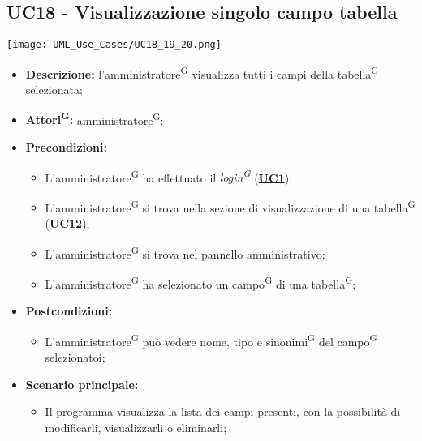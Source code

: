 \subsection{UC18 - Visualizzazione singolo campo tabella}
\label{sec:UC18}
\texttt{[image: UML\_Use\_Cases/UC18\_19\_20.png]}
\begin{itemize}
	\item \textbf{Descrizione:} l’amministratore\textsuperscript{G} visualizza tutti i campi della tabella\textsuperscript{G} selezionata;
	\item \textbf{Attori\textsuperscript{G}:} amministratore\textsuperscript{G};
	\item \textbf{Precondizioni:} 
	\begin{itemize}
		\item L’amministratore\textsuperscript{G} ha effettuato il \textit{login\textsuperscript{G}} (\hyperref[sec:UC1]{\textbf{UC1}});
		\item L’amministratore\textsuperscript{G} si trova nella sezione di visualizzazione di una tabella\textsuperscript{G} (\hyperref[sec:UC12]{\textbf{UC12}});
		\item L’amministratore\textsuperscript{G} si trova nel pannello amministrativo;
		\item L'amministratore\textsuperscript{G} ha selezionato un campo\textsuperscript{G} di una tabella\textsuperscript{G};
	\end{itemize}
	\item \textbf{Postcondizioni:} 
	\begin{itemize}
		\item L'amministratore\textsuperscript{G} può vedere nome, tipo e sinonimi\textsuperscript{G} del campo\textsuperscript{G} selezionatoi;
	\end{itemize}
	\item \textbf{Scenario principale:} 
	\begin{itemize}
		\item Il programma visualizza la lista dei campi presenti, con la possibilità di modificarli, visualizzarli o eliminarli;
	\end{itemize}
\end{itemize}

